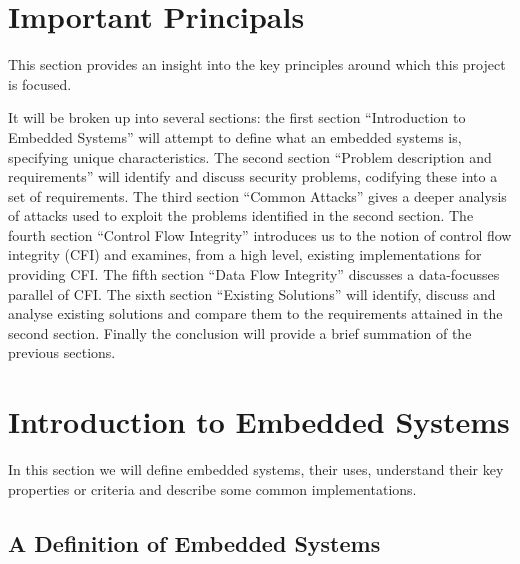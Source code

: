 \section{Important Principals}

This section provides an insight into the key principles around which this project is focused.

It will be broken up into several sections: the first section ``Introduction to Embedded Systems'' will attempt to define what an embedded systems is, specifying unique characteristics. The second section ``Problem description and requirements'' will identify and discuss security problems, codifying these into a set of requirements. The third section ``Common Attacks'' gives a deeper analysis of attacks used to exploit the problems identified in the second section. The fourth section ``Control Flow Integrity'' introduces us to the notion of control flow integrity (CFI) and examines, from a high level, existing implementations for providing CFI. The fifth section ``Data Flow Integrity'' discusses a data-focusses parallel of CFI. The sixth section ``Existing Solutions'' will identify, discuss and analyse existing solutions and compare them to the requirements attained in the second section. Finally the conclusion will provide a brief summation of the previous sections.

\section{Introduction to Embedded Systems}

In this section we will define embedded systems, their uses, understand their key properties or criteria and describe some common implementations.


\subsection{A Definition of Embedded Systems}

